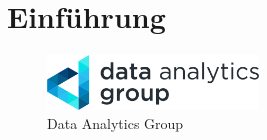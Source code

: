 \chapter{Einführung}

\lipsum[1-4]

\begin{figure}[h]
\centering
\includegraphics[width=0.5\textwidth]{img/data_analytics_group.png}
\caption[Data Analytics Group]{Data Analytics Group}
\label{fig:data_analytics_group}
\end{figure}

\lipsum[5]